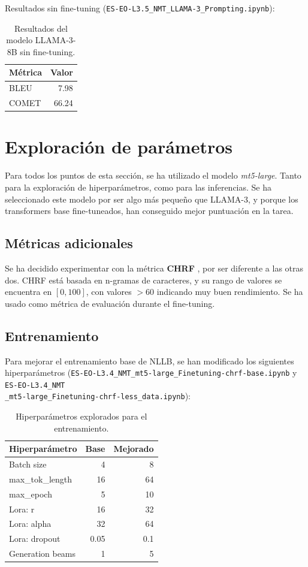 \documentclass[11pt,spanish,listoffigures,listoftables]{tfgetsinf}
\begin{document}
Resultados sin fine-tuning (\texttt{ES-EO-L3.5\_NMT\_LLAMA-3\_Prompting.ipynb}):

\begin{table}[H]
\centering
\begin{tabular}{lr}
	\toprule
	\textbf{Métrica} & \textbf{Valor} \\
	\midrule
	BLEU & 7.98 \\
	COMET & 66.24 \\
	\bottomrule
\end{tabular}
\caption{Resultados del modelo LLAMA-3-8B sin fine-tuning.}
\label{tab:llama3_prompting}
\end{table}

\section{Exploración de parámetros}
Para todos los puntos de esta sección, se ha utilizado el modelo \textit{mt5-large}. Tanto para la exploración de hiperparámetros, como para las inferencias. Se ha seleccionado este modelo por ser algo más pequeño que LLAMA-3, y porque los transformers base fine-tuneados, han conseguido mejor puntuación en la tarea.

\subsection{Métricas adicionales}
Se ha decidido experimentar con la métrica \textbf{CHRF} \cite{evaluate-metric-2025-chrf}, por ser diferente a las otras dos. CHRF está basada en n-gramas de caracteres, y su rango de valores se encuentra en $[0, 100]$, con valores $>60$ indicando muy buen rendimiento. Se ha usado como métrica de evaluación durante el fine-tuning. 
\subsection{Entrenamiento}
Para mejorar el entrenamiento base de NLLB, se han modificado los siguientes hiperparámetros (\texttt{ES-EO-L3.4\_NMT\_mt5-large\_Finetuning-chrf-base.ipynb} y \texttt{ES-EO-L3.4\_NMT\\\_mt5-large\_Finetuning-chrf-less\_data.ipynb}):

\begin{table}[H]
\centering
\begin{tabular}{lrr}
	\toprule
	\textbf{Hiperparámetro} & \textbf{Base} & \textbf{Mejorado} \\
	\midrule
	Batch size & 4 & 8 \\
	max\_tok\_length & 16 & 64 \\
	max\_epoch & 5 & 10 \\
	Lora: r & 16 & 32 \\
	Lora: alpha & 32 & 64 \\
	Lora: dropout & 0.05 & 0.1 \\
	Generation beams & 1 & 5 \\
	\bottomrule
\end{tabular}
\caption{Hiperparámetros explorados para el entrenamiento.}
\label{tab:hyperparams}
\end{table}
\end{document}
